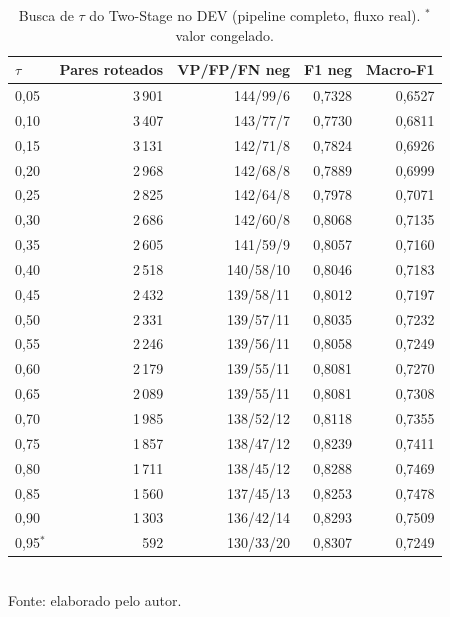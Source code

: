 \begin{table}[htbp]
  \centering
  \caption{Busca de $\tau$ do Two-Stage no DEV (pipeline completo, fluxo real). $^{\ast}$ valor congelado.}
  \label{tab:tau}
  \begin{tabular}{lrrrr}
  \toprule
  $\tau$ & Pares roteados & VP/FP/FN neg & F1 neg & Macro-F1 \\
  \midrule
0{,}05 & 3\,901 & 144/99/6 & 0{,}7328 & 0{,}6527 \\
0{,}10 & 3\,407 & 143/77/7 & 0{,}7730 & 0{,}6811 \\
0{,}15 & 3\,131 & 142/71/8 & 0{,}7824 & 0{,}6926 \\
0{,}20 & 2\,968 & 142/68/8 & 0{,}7889 & 0{,}6999 \\
0{,}25 & 2\,825 & 142/64/8 & 0{,}7978 & 0{,}7071 \\
0{,}30 & 2\,686 & 142/60/8 & 0{,}8068 & 0{,}7135 \\
0{,}35 & 2\,605 & 141/59/9 & 0{,}8057 & 0{,}7160 \\
0{,}40 & 2\,518 & 140/58/10 & 0{,}8046 & 0{,}7183 \\
0{,}45 & 2\,432 & 139/58/11 & 0{,}8012 & 0{,}7197 \\
0{,}50 & 2\,331 & 139/57/11 & 0{,}8035 & 0{,}7232 \\
0{,}55 & 2\,246 & 139/56/11 & 0{,}8058 & 0{,}7249 \\
0{,}60 & 2\,179 & 139/55/11 & 0{,}8081 & 0{,}7270 \\
0{,}65 & 2\,089 & 139/55/11 & 0{,}8081 & 0{,}7308 \\
0{,}70 & 1\,985 & 138/52/12 & 0{,}8118 & 0{,}7355 \\
0{,}75 & 1\,857 & 138/47/12 & 0{,}8239 & 0{,}7411 \\
0{,}80 & 1\,711 & 138/45/12 & 0{,}8288 & 0{,}7469 \\
0{,}85 & 1\,560 & 137/45/13 & 0{,}8253 & 0{,}7478 \\
0{,}90 & 1\,303 & 136/42/14 & 0{,}8293 & 0{,}7509 \\
0{,}95$^{\ast}$ & 592 & 130/33/20 & 0{,}8307 & 0{,}7249 \\
  \bottomrule
  \end{tabular}\\[4pt]
  {\footnotesize Fonte: elaborado pelo autor.}
\end{table}

